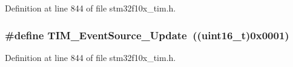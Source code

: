 Definition at line 844 of file stm32f10x\+\_\+tim.\+h.

\subsubsection[{\texorpdfstring{T\+I\+M\+\_\+\+Event\+Source\+\_\+\+Update}{TIM_EventSource_Update}}]{\setlength{\rightskip}{0pt plus 5cm}\#define T\+I\+M\+\_\+\+Event\+Source\+\_\+\+Update~(({\bf uint16\+\_\+t})0x0001)}\hypertarget{group___t_i_m___event___source_ga5bff72fbe94b1ae5a710e402c9868b23}{}\label{group___t_i_m___event___source_ga5bff72fbe94b1ae5a710e402c9868b23}


Definition at line 844 of file stm32f10x\+\_\+tim.\+h.


